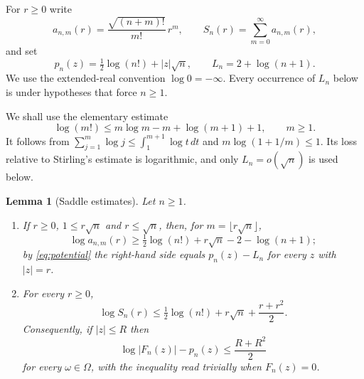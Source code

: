 \documentclass[plain]{baustms}
\theoremstyle{cupthm}
\newtheorem{lemma}[theorem]{Lemma}
\begin{document}
For $r\geq0$ write
\[
 a_{n,m}(r)=\frac{\sqrt{(n+m)!}}{m!}\,r^m,
 \qquad
 S_n(r)=\sum_{m=0}^{\infty}a_{n,m}(r),
\]
and set
\begin{equation}\label{eq:potential}
 p_n(z)=\tfrac12\log(n!)+|z|\sqrt n,
 \qquad
 L_n=2+\log(n+1).
\end{equation}
We use the extended-real convention $\log0=-\infty$. Every occurrence of
$L_n$ below is under hypotheses that force $n\geq1$.

We shall use the elementary estimate
\[
 \log(m!)\leq m\log m-m+\log(m+1)+1,\qquad m\geq1.
\]
It follows from $\sum_{j=1}^m\log j\leq\int_1^{m+1}\log t\,dt$ and
$m\log(1+1/m)\leq1$. Its loss relative to Stirling's estimate is logarithmic,
and only $L_n=o(\sqrt n)$ is used below.

\begin{lemma}[Saddle estimates]\label{lem:saddle}
Let $n\geq1$.
\begin{enumerate}[\rm(1)]
\item If $r\geq0$, $1\leq r\sqrt n$ and $r\leq\sqrt n$, then, for
$m=\lfloor r\sqrt n\rfloor$,
\[
 \log a_{n,m}(r)\geq\tfrac12\log(n!)+r\sqrt n-2-\log(n+1);
\]
by \eqref{eq:potential} the right-hand side equals $p_n(z)-L_n$ for every
$z$ with $|z|=r$.
\item For every $r\geq0$,
\[
 \log S_n(r)\leq\tfrac12\log(n!)+r\sqrt n+\frac{r+r^2}{2}.
\]
Consequently, if $|z|\leq R$ then
\begin{equation}\label{eq:upper}
 \log|F_n(z)|-p_n(z)\leq\frac{R+R^2}{2}
\end{equation}
for every $\omega\in\Omega$, with the inequality read trivially when
$F_n(z)=0$.
\end{enumerate}
\end{lemma}
\end{document}
